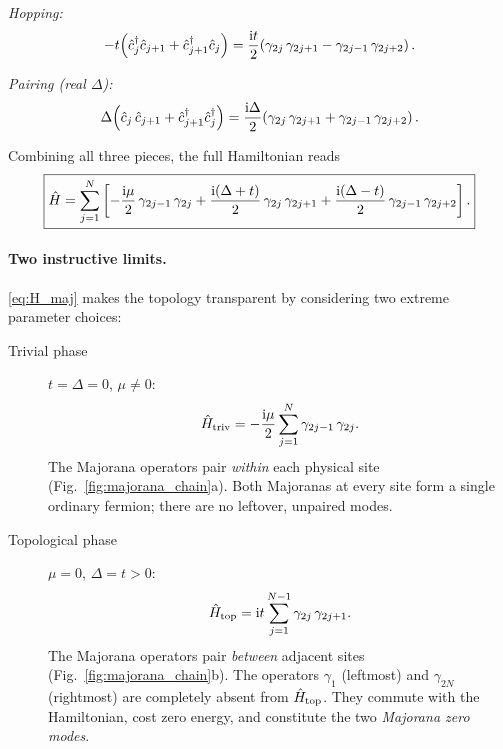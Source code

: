 \noindent\textit{Hopping:}
\begin{align}
    -t\!\left(\hat{c}_j^{\dag}\hat{c}_{j+1} + \hat{c}_{j+1}^{\dag}\hat{c}_j\right)
    = \frac{\mathrm{i} t}{2}\!\left(\gamma_{2j}\,\gamma_{2j+1} - \gamma_{2j-1}\,\gamma_{2j+2}\right).
\end{align}

\noindent\textit{Pairing (real $\Delta$):}
\begin{align}
    \Delta\!\left(\hat{c}_j\,\hat{c}_{j+1} + \hat{c}_{j+1}^{\dag}\hat{c}_j^{\dag}\right)
    = \frac{\mathrm{i}\Delta}{2}\!\left(\gamma_{2j}\,\gamma_{2j+1} + \gamma_{2j-1}\,\gamma_{2j+2}\right).
\end{align}

Combining all three pieces, the full Hamiltonian reads
\begin{align}
    \boxed{
    \hat{H} = \sum_{j=1}^{N}\left[
    -\frac{\mathrm{i}\mu}{2}\,\gamma_{2j-1}\,\gamma_{2j}
    +\frac{\mathrm{i}(\Delta+t)}{2}\,\gamma_{2j}\,\gamma_{2j+1}
    +\frac{\mathrm{i}(\Delta-t)}{2}\,\gamma_{2j-1}\,\gamma_{2j+2}
    \right].}
    \label{eq:H_maj}
\end{align}

\paragraph{Two instructive limits.}
\eqref{eq:H_maj} makes the topology transparent by considering two extreme parameter choices:

\begin{description}
\item[Trivial phase] $t = \Delta = 0$, $\mu \neq 0$:
\begin{align}
    \hat{H}_{\rm triv} = -\frac{\mathrm{i}\mu}{2}\sum_{j=1}^{N}\gamma_{2j-1}\,\gamma_{2j}.
\end{align}
The Majorana operators pair \emph{within} each physical site (Fig.~\ref{fig:majorana_chain}a). Both Majoranas at every site form a single ordinary fermion; there are no leftover, unpaired modes.

\item[Topological phase] $\mu = 0$, $\Delta = t > 0$:
\begin{align}
    \hat{H}_{\rm top} = \mathrm{i} t\sum_{j=1}^{N-1}\gamma_{2j}\,\gamma_{2j+1}.
    \label{eq:H_top_special}
\end{align}
The Majorana operators pair \emph{between} adjacent sites (Fig.~\ref{fig:majorana_chain}b). The operators $\gamma_1$ (leftmost) and $\gamma_{2N}$ (rightmost) are completely absent from $\hat{H}_{\rm top}$. They commute with the Hamiltonian, cost zero energy, and constitute the two \emph{Majorana zero modes}.
\end{description}

